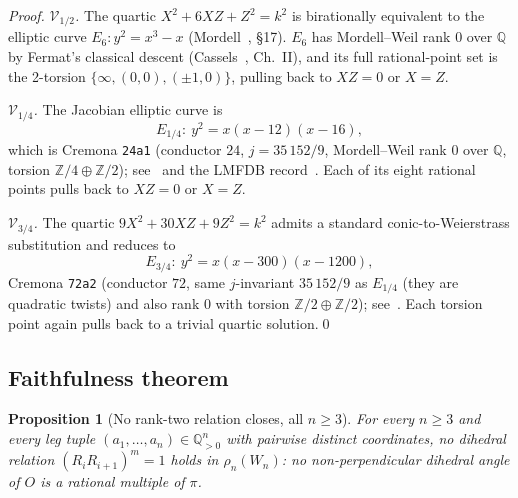 \documentclass[11pt,a4paper]{article}
\newtheorem{proposition}[theorem]{Proposition}
\theoremstyle{remark}
\theoremstyle{plain}
\begin{document}
\begin{proof}
\emph{$\mathcal{V}_{1/2}$.}  The quartic
$X^2 + 6 X Z + Z^2 = k^2$ is birationally equivalent to the elliptic
curve $E_6 : y^2 = x^3 - x$ (Mordell~\cite{mordell-1969}, §17).
$E_6$ has Mordell--Weil rank $0$ over $\mathbb{Q}$ by Fermat's
classical descent (Cassels~\cite{cassels-1991}, Ch.~II), and its
full rational-point set is the 2-torsion
$\{\infty, (0, 0), (\pm 1, 0)\}$, pulling back to $X Z = 0$ or
$X = Z$.

\emph{$\mathcal{V}_{1/4}$.}  The Jacobian elliptic curve is
\[
E_{1/4} :\ y^2 = x(x - 12)(x - 16),
\]
which is Cremona \texttt{24a1} (conductor $24$, $j = 35\,152/9$,
Mordell--Weil rank $0$ over $\mathbb{Q}$, torsion
$\mathbb{Z}/4 \oplus \mathbb{Z}/2$); see~\cite{cremona-1997}
and the LMFDB record~\cite{lmfdb-24a1}.  Each of its eight rational
points pulls back to $X Z = 0$ or $X = Z$.

\emph{$\mathcal{V}_{3/4}$.}  The quartic $9 X^2 + 30 X Z + 9 Z^2 = k^2$
admits a standard conic-to-Weierstrass substitution and reduces to
\[
E_{3/4} :\ y^2 = x(x - 300)(x - 1200),
\]
Cremona \texttt{72a2} (conductor $72$, same $j$-invariant $35\,152/9$
as $E_{1/4}$ (they are quadratic twists) and also rank $0$ with
torsion $\mathbb{Z}/2 \oplus \mathbb{Z}/2$); see~\cite{cremona-1997,
lmfdb-72a2}.  Each torsion point again pulls back to a trivial
quartic solution.\qed
\end{proof}

\subsection{Faithfulness theorem}

\begin{proposition}[No rank-two relation closes, all $n \ge 3$]
\label{prop:no-rank2}
For every $n \ge 3$ and every leg tuple $(a_1, \ldots, a_n) \in
\mathbb{Q}_{>0}^n$ with pairwise distinct coordinates, no dihedral relation
$(R_i R_{i+1})^m = 1$ holds in $\rho_n(W_n)$: no non-perpendicular dihedral
angle of $O$ is a rational multiple of $\pi$.
\end{proposition}
\end{document}
